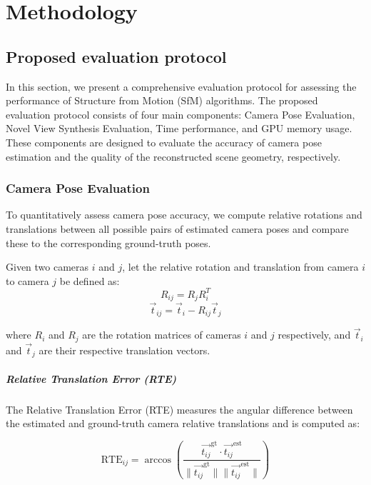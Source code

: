 \chapter{Methodology}\label{chap:methodology}

\section{Proposed evaluation protocol}\label{sec:proposed-evaluation-protocol}

In this section, we present a comprehensive evaluation protocol for assessing the performance of Structure from Motion (SfM) algorithms.
The proposed evaluation protocol consists of four main components: Camera Pose Evaluation, Novel View Synthesis Evaluation, Time performance, and GPU memory usage.
These components are designed to evaluate the accuracy of camera pose estimation and the quality of the reconstructed scene geometry, respectively.

\subsection{Camera Pose Evaluation}
To quantitatively assess camera pose accuracy, we compute relative rotations and translations between all possible pairs of estimated camera poses and compare these to the corresponding ground-truth poses.

Given two cameras \( i \) and \( j \), let the relative rotation and translation from camera \( i \) to camera \( j \) be defined as:
\begin{equation}
    R_{ij} = R_j R_i^T
\end{equation}
\begin{equation}
    \vec{t}_{ij} = \vec{t}_i - R_{ij} \vec{t}_j
\end{equation}

where \( R_i \) and \( R_j \) are the rotation matrices of cameras \( i \) and \( j \) respectively, and \( \vec{t}_i \) and \( \vec{t}_j \) are their respective translation vectors.

\paragraph{Relative Translation Error (RTE)}
The Relative Translation Error (RTE) measures the angular difference between the estimated and ground-truth camera relative translations and is computed as:

\begin{equation}
    \text{RTE}_{ij} = \arccos\left(\frac{\vec{t_{ij}}^{\text{gt}} \cdot \vec{t_{ij}}^{\text{est}}}{\lVert \vec{t_{ij}}^{\text{gt}} \rVert \lVert \vec{t_{ij}}^{\text{est}} \rVert}\right)
\end{equation}


